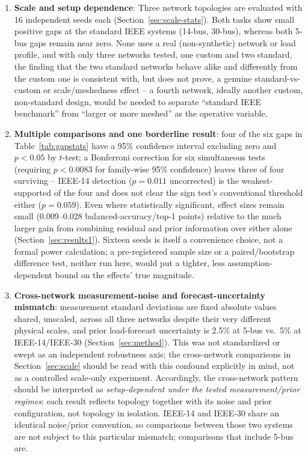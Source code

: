 \documentclass[conference]{IEEEtran}
\begin{document}
\begin{enumerate}
\item \textbf{Scale and setup dependence}: Three network topologies are evaluated with 16 independent seeds each (Section~\ref{sec:scale-stats}). Both tasks show small positive gaps at the standard IEEE systems (14-bus, 30-bus), whereas both 5-bus gaps remain near zero. None uses a real (non-synthetic) network or load profile, and with only three networks tested, one custom and two standard, the finding that the two standard networks behave alike and differently from the custom one is consistent with, but does not prove, a genuine standard-vs-custom or scale/meshedness effect -- a fourth network, ideally another custom, non-standard design, would be needed to separate ``standard IEEE benchmark'' from ``larger or more meshed'' as the operative variable.
\item \textbf{Multiple comparisons and one borderline result}: four of the six gaps in Table~\ref{tab:gapstats} have a 95\% confidence interval excluding zero and $p<0.05$ by $t$-test; a Bonferroni correction for six simultaneous tests (requiring $p<0.0083$ for family-wise 95\% confidence) leaves three of four surviving -- IEEE-14 detection ($p=0.011$ uncorrected) is the weakest-supported of the four and does not clear the sign test's conventional threshold either ($p=0.059$). Even where statistically significant, effect sizes remain small (0.009--0.028 balanced-accuracy/top-1 points) relative to the much larger gain from combining residual and prior information over either alone (Section~\ref{sec:results1}). Sixteen seeds is itself a convenience choice, not a formal power calculation; a pre-registered sample size or a paired/bootstrap difference test, neither run here, would put a tighter, less assumption-dependent bound on the effects' true magnitude.
\item \textbf{Cross-network measurement-noise and forecast-uncertainty mismatch}: measurement standard deviations are fixed absolute values shared, unscaled, across all three networks despite their very different physical scales, and prior load-forecast uncertainty is 2.5\% at 5-bus vs.\ 5\% at IEEE-14/IEEE-30 (Section~\ref{sec:method}). This was not standardized or swept as an independent robustness axis; the cross-network comparisons in Section~\ref{sec:scale} should be read with this confound explicitly in mind, not as a controlled scale-only experiment. Accordingly, the cross-network pattern should be interpreted as \emph{setup-dependent under the tested measurement/prior regimes}: each result reflects topology together with its noise and prior configuration, not topology in isolation. IEEE-14 and IEEE-30 share an identical noise/prior convention, so comparisons between those two systems are not subject to this particular mismatch; comparisons that include 5-bus are.

\end{enumerate}
\end{document}
